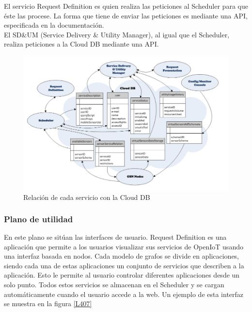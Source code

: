 \documentclass[12pt, twoside]{book}
\begin{document}
El servicio Request Definition es quien realiza las peticiones al Scheduler para que éste las procese. La forma que tiene de enviar las peticiones es mediante una API, especificada en la documentación.\\
El SD\&UM (Service Delivery \& Utility Manager), al igual que el Scheduler, realiza peticiones a la Cloud DB mediante una API.
\begin{figure}[H]
\centering
\includegraphics[scale=0.4]{images/cloud_capture}
\caption{Relación de cada servicio con la Cloud DB}\label{L406}
\end{figure}
\subsubsection*{Plano de utilidad}
En este plano se sitúan las interfaces de usuario. 
Request Definition es una aplicación que permite a los usuarios visualizar sus servicios de OpenIoT usando una interfaz basada en nodos. Cada modelo de grafos se divide en aplicaciones, siendo cada una de estas aplicaciones un conjunto de servicios que describen a la aplicación. Esto le permite al usuario controlar diferentes aplicaciones desde un solo punto. Todos estos servicios se almacenan en el Scheduler y se cargan automáticamente cuando el usuario accede a la web. Un ejemplo de esta interfaz se muestra en la figura \ref{L407}
\end{document}
